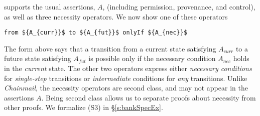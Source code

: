 \Nec supports the usual assertions, $A$, (including permission, provenance,
and control), as well as three necessity 
{operators. We now show one of these operators} 
\begin{lstlisting}[mathescape=true, language=chainmail, frame=lines]
                                from ${A_{curr}}$ to ${A_{fut}}$ onlyIf ${A_{nec}}$ 
\end{lstlisting}
The  form   {above} says that %
a  {transition} from a current state satisfying $A_{curr}$ to a future
state satisfying $A_{fut}$ %
is possible only if the necessary condition
$A_{nec}$ holds in the \emph{current} state.
 {The other two operators express either \emph{necessary conditions} for
\emph{single-step} transitions %
or \emph{intermediate} conditions for \emph{any} transitions.
}
Unlike  \emph{Chainmail}, 
 the necessity operators %
 are second class, and may not appear in the assertions $A$.
Being second class allows us to separate proofs about necessity from other proofs.
We formalize (S3) %
in  \S\ref{s:bankSpecEx}.


 
